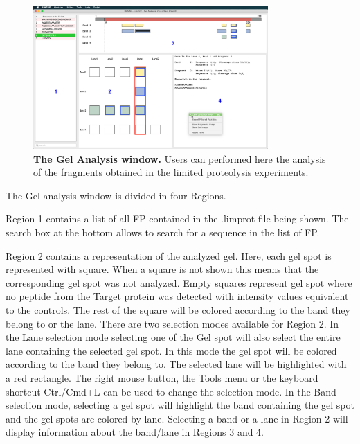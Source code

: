 \begin{figure}[h]
    \centering
    \includegraphics[width=0.8\textwidth]{./IMAGES/MOD-LIMPROT/limprot-frag.jpg}	    
    \caption[The Gel Analysis window]{\textbf{The Gel Analysis window.} Users can performed here the analysis of the fragments obtained in the limited proteolysis experiments.} 
    \label{fig:limprotResultsWindow}
    \vspace{-5pt} 	
\end{figure}

The Gel analysis window is divided in four Regions.

Region \num{1} contains a list of all FP contained in the .limprot file being shown. The search box at the bottom allows to search for a sequence in the list of FP. 

Region \num{2} contains a representation of the analyzed gel. Here, each gel spot is represented with square. When a square is not shown this means that the corresponding gel spot was not analyzed. Empty squares represent gel spot where no peptide from the Target protein was detected with intensity values equivalent to the controls. The rest of the square will be colored according to the band they belong to or the lane. There are two selection modes available for Region \num{2}. In the Lane selection mode selecting one of the Gel spot will also select the entire lane containing the selected gel spot. In this mode the gel spot will be colored according to the band they belong to. The selected lane will be highlighted with a red rectangle. The right mouse button, the Tools menu or the keyboard shortcut Ctrl/Cmd+L can be used to change the selection mode. In the Band selection mode, selecting a gel spot will highlight the band containing the gel spot and the gel spots are colored by lane. Selecting a band or a lane in Region \num{2} will display information about the band/lane in Regions \num{3} and \num{4}.

